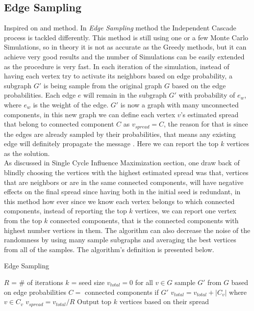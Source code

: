 \documentclass[english]{tktltiki}
\begin{document}
\subsection{Edge Sampling}
Inspired on \cite{chen09} and \cite{cheng13} method. In \textit{Edge Sampling} method the Independent Cascade process is tackled differently. This method is still using one or a few Monte Carlo Simulations, so in theory it is not as accurate as the Greedy methods, but it can achieve very good results and the number of Simulations can be easily extended as the procedure is very fast. In each iteration of the simulation, instead of having each vertex try to activate its neighbors based on edge probability, a subgraph $G'$ is being sample from the original graph $G$ based on the edge probabilities. Each edge $e$ will remain in the subgraph $G'$ with probability of $e_w$, where $e_w$ is the weight of the edge. $G'$ is now a graph with many unconnected components, in this new graph we can define each vertex $v$'s estimated spread that belong to connected component $C$ as $v_{spread} = C$, the reason for that is since the edges are already sampled by their probabilities, that means any existing edge will definitely propagate the message . Here we can report the top $k$ vertices as the solution. \\
As discussed in Single Cycle Influence Maximization section, one draw back of blindly choosing the vertices with the highest estimated spread was that, vertices that are neighbors or are in the same connected components, will have negative effects on the final spread since having both in the initial seed is redundant, in this method how ever since we know each vertex belongs to which connected components, instead of reporting the top $k$ vertices, we can report one vertex from the top $k$ connected components, that is the connected components with highest number vertices in them. The algorithm can also decrease the noise of the randomness by using many sample subgraphs and averaging the best vertices from all of the samples. The algorithm's definition is presented below.
\begin{algorithm}[ht!]
\caption{Edge Sampling}
\label{alg:edgesampling}
\begin{algorithmic}
\Require $R$ = \# of iterations
\Require $k$ = seed size
\State $v_{total}=0$ for all $v \in G$
	\State sample $G'$ from $G$ based on edge probabilities
	\State $C =$ connected components if $G'$
       	\State $v_{total} = v_{total} + |C_v|$ where $v \in C_v$
	\EndFor
\EndFor
{}
	\State $v_{spread}=v_{total}/R$
\EndFor
\State Output top $k$ vertices based on their spread
\end{algorithmic}
\end{algorithm}
\end{document}
